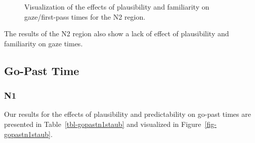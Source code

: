 \documentclass[
  letterpaper,
  DIV=11,
  numbers=noendperiod,
  nottoc]{scrreprt}
\begin{document}
\begin{figure}[htbp]


\caption{\label{fig-gazen2staub}Visualization of the effects of
plausibility and familiarity on gaze/first-pass times for the N2
region.}

\end{figure}%

The results of the N2 region also show a lack of effect of plausibility
and familiarity on gaze times.

\subsection{Go-Past Time}\label{go-past-time-2}

\subsubsection{N1}\label{n1-6}

Our results for the effects of plausibility and predictability on
go-past times are presented in Table~\ref{tbl-gopastn1staub} and
visualized in Figure~\ref{fig-gopastn1staub}.
\end{document}

